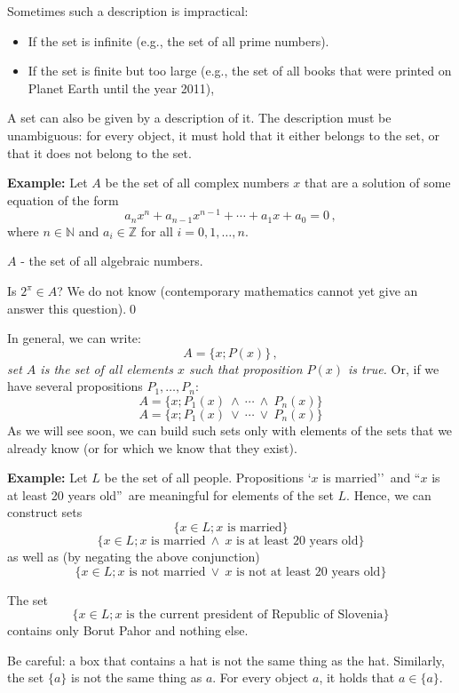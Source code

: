 \documentclass[11pt,paper=b5,footinclude,headinclude]{scrbook} %
\def\ali {{~\vee~}}
\def\inn {{~\wedge~}}
\theoremstyle{remark}
\theoremstyle{definition} %
\theoremstyle{theorem} %
\begin{document}
\medskip
Sometimes such a description is impractical:
\begin{itemize}
  \item If the set is infinite (e.g., the set of all prime numbers).
  \item If the set is finite but too large (e.g., the set of all books that were printed on Planet Earth until the year 2011),
\end{itemize}

\medskip
A set can also be given by a description of it. The description must be unambiguous:
for every object, it must hold that it either belongs to the set, or that it does not belong to the set.

\medskip
\textbf{ Example:} Let $A$ be the set of all complex numbers  $x$ that are a solution of some equation of the form
$$a_nx^n+a_{n-1}x^{n-1}+\cdots+a_1x+a_0 = 0\,,$$
where $n\in \mathbb{N}$ and $a_i\in \mathbb{Z}$ for all $i= 0,1,\ldots, n$.

\medskip
$A$ - the set of all algebraic numbers.

Is $2^{\pi}\in A$? We do not know (contemporary mathematics cannot yet give an answer this question).\qed

\medskip
In general, we can write:
$$A = \{x; P(x)\}\,,$$
{\em set $A$ is the set of all elements $x$ such that proposition $P(x)$ is true.}
Or, if we have several propositions $P_1,\ldots, P_n$:
$$A = \{x; P_1(x)\inn \cdots\inn P_n(x)\}$$
$$A = \{x; P_1(x)\ali \cdots\ali P_n(x)\}$$
As we will see soon, we can build such sets only with elements of the sets that we already know (or for which we know that they exist).

\medskip
\textbf{ Example:}
Let  $L$ be the set of all people. Propositions `$x$ is married''~and ``$x$ is at least 20 years old''~are meaningful for elements of the set $L$.
Hence, we can construct sets
      $$\{x\in L; x \textrm{ is married}\}$$
      $$\{x\in L; x \textrm{ is married} \inn x \textrm{ is at least 20 years old}\}$$
as well as (by negating the above conjunction)
      $$\{x\in L; x \textrm{ is not married} \ali x \textrm{ is not at least 20 years old}\}$$

The set
      $$\{x\in L; x \textrm{ is the current president of Republic of Slovenia}\}$$
contains only Borut Pahor and nothing else.

\medskip
Be careful: a box that contains a hat is not the same thing as the hat.
Similarly, the set
$\{a\}$ is not the same thing as $a$. For every object $a$, it holds that $a\in \{a\}$.
\end{document}
